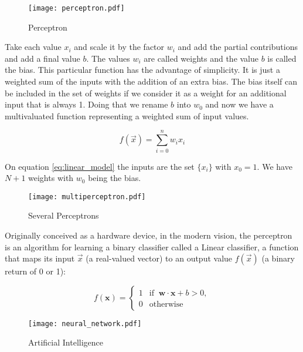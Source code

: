 \documentclass[10pt]{book}
\begin{document}
\begin{center}
\begin{figure}
\texttt{[image: perceptron.pdf]}
\caption{Perceptron}
\label{fig:perceptron}
\end{figure}
\end{center}

Take each value $x_i$ and scale it by the factor $w_i$ and add the partial contributions and add a final value $b$. 
The values $w_i$ are called weights and the value $b$ is called the bias.
This particular function has the advantage of simplicity.
It is just a weighted sum of the inputs with the addition of an extra bias.
The bias itself can be included in the set of weights if we consider it as a weight for an additional input that is always 1. 
Doing that we rename $b$ into $w_0$ and now we have a multivaluated function representing a weighted sum of input values.

\begin{equation}
f(\vec{x}) = \sum_{i=0}^n w_i x_i 
\label{eq:linear_model}
\end{equation}

On equation \ref{eq:linear_model} the inputs are the set $\{x_i\}$ with $x_0 = 1$. We have $N+1$ weights with $w_0$ being the bias. 




\begin{center}
\begin{figure}
\texttt{[image: multiperceptron.pdf]}
\caption{Several Perceptrons}
\end{figure}
\end{center}


Originally conceived as a hardware device, in the modern vision, the perceptron is an algorithm for learning a binary classifier called a Linear classifier, a function that maps its input $\vec{x}$ (a real-valued vector) to an output value $f(\vec{x})$ (a binary return of 0 or 1):


\[
f(\mathbf{x}) = \begin{cases}
1 & \text{if }\ \mathbf{w} \cdot \mathbf{x} + b > 0,\\0 & \text{otherwise}
\end{cases}
\]




\begin{center}
\begin{figure}
\texttt{[image: neural\_network.pdf]}
\caption{Artificial Intelligence}
\end{figure}
\end{center}
\end{document}
